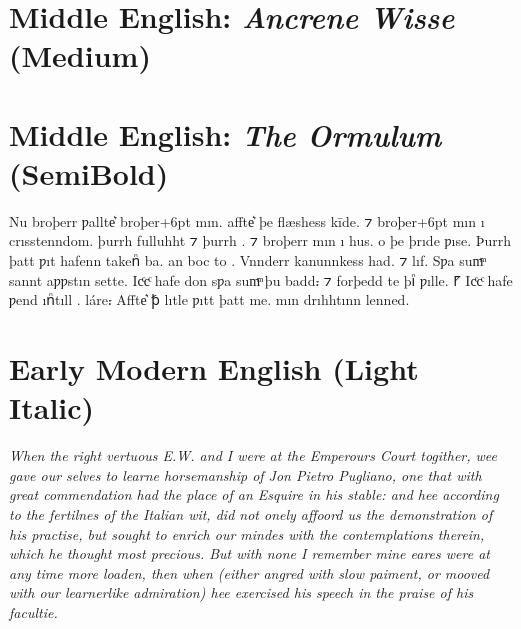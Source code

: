 \documentclass[12pt,letterpaper,openany]{book}
\begin{document}
\section{Middle English: \textit{Ancrene Wisse} (Medium)}

{\large\medium{}}

\section{Middle English: \textit{The Ormulum} (SemiBold)}

{\large\semibold{}
Nu broþerr ƿallte͛ broþer\kern-6ptᫍ\kern+6pt{} mın. affte͛ þe flæshess kīde. ⁊
broþer\kern-6ptᫍ\kern+6pt{} mın ı crısstenndom.
þurrh fulluhht ⁊ þurrh . ⁊ broþerr mın ı  hus.
 o þe þrıde ƿıse.
Þurrh þatt ƿıt hafenn takenᷠ ba. an  boc to .
Vnnderr kanunnkess had.
⁊ lıf. Sƿa sumͫ sannt aƿƿstın sette. Icͨcͨ hafe don sƿa sumͫ þu badd⹎ ⁊ forþedd te
þıᷠ ƿılle. ⹍ Icͨcͨ hafe ƿend ınᷠtıll . 
 láre⹎ Affte͛ ꝥ lıtᫎle
ƿıtt þatt me. mın drıhhtınn  lenned.}

\section{Early Modern English (Light Italic)}

\textit{\large\itallight{}When the right vertuous E.W. and I were at the Emperours Court togither, wee gave our selves to learne horsemanship of Jon Pietro Pugliano, one that with great commendation had the place of an Esquire in his stable: and hee according to the fertilnes of the Italian wit, did not onely affoord us the demonstration of his practise, but sought to enrich our \mbox{mindes} with the contemplations therein, which he thought most precious. But with none I remember mine eares were at any time more loaden, then when (either angred with slow paiment, or mooved with our learnerlike admiration) hee exercised his speech in the praise of his facultie.}
\end{document}
